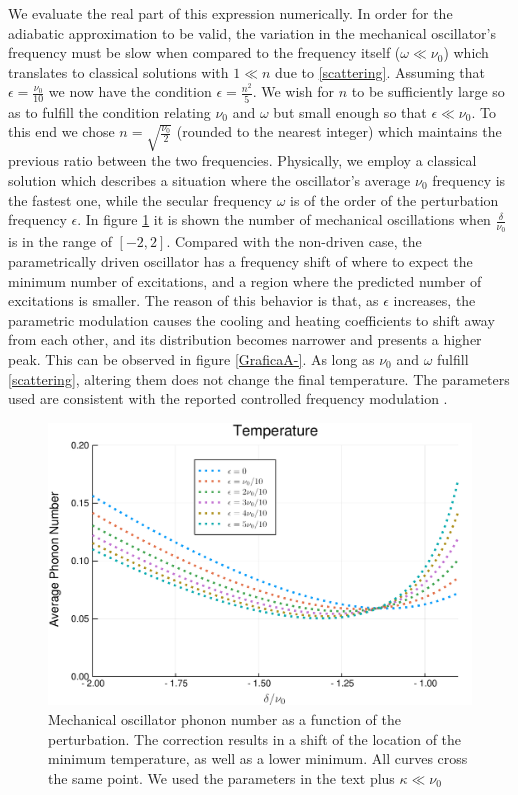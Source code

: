 \documentclass[reprint, amsmath,amssymb, aps,pra]{revtex4-1}
\begin{document}
We evaluate the real part of this expression numerically. In order for
the adiabatic approximation to be valid, the variation in the
mechanical oscillator's frequency must be slow when compared to the
frequency itself ($\omega \ll \nu_0$) which translates to classical
solutions with $1 \ll n$ due to \eqref{scattering}. Assuming that
$\epsilon = \frac{\nu_0}{10}$ we now have the condition
$\epsilon = \frac{n^2}{5}$. We wish for $n$ to be sufficiently large
so as to fulfill the condition relating $\nu_0$ and $\omega$ but small
enough so that $\epsilon \ll \nu_0$. To this end we chose
$n=\sqrt{\frac{\nu_0}{2}}$ (rounded to the nearest integer) which
maintains the previous ratio between the two frequencies. Physically,
we employ a classical solution which describes a situation where the
oscillator's average $\nu_0$ frequency is the fastest one, while the
secular frequency $\omega$ is of the order of the perturbation
frequency $\epsilon$. In figure \ref{GraficaTemp} it is shown the
number of mechanical oscillations when $\frac{\delta}{\nu_0}$ is in
the range of $[-2,2]$. Compared with the non-driven case, the
parametrically driven oscillator has a frequency shift of where to
expect the minimum number of excitations, and a region where the
predicted number of excitations is smaller. The reason of this
behavior is that, as $\epsilon$ increases, the parametric modulation
causes the cooling and heating coefficients to shift away from each
other, and its distribution becomes narrower and presents a higher
peak. This can be observed in figure \ref{GraficaA-}. As long as
$\nu_0$ and $\omega$ fulfill \eqref{scattering}, altering them does
not change the final temperature. The parameters used are consistent
with the reported controlled frequency modulation
\cite{WoolleyNM}\cite{JockelS}. 



\begin{figure}
\includegraphics[scale=.4]{Temperature.pdf}  
\caption{ Mechanical oscillator phonon number as a function of the
  perturbation. The correction results in a shift of the location of
  the minimum temperature, as well as a lower minimum. All curves
  cross the same point. We used the parameters in the text plus
  $\kappa \ll \nu_0$}
\label{GraficaTemp}
\end{figure}
\end{document}
